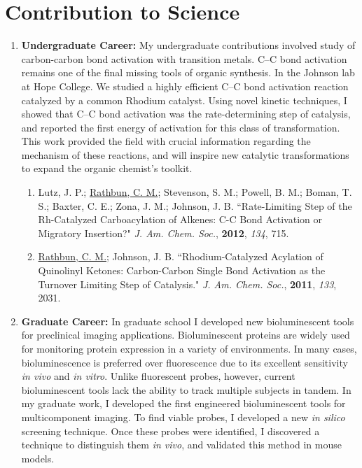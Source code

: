 \documentclass{nihbiosketch}
\begin{document}

\section{Contribution to Science}

\begin{enumerate}

\item \textbf{Undergraduate Career:} My undergraduate contributions involved study of carbon-carbon bond activation with transition metals. C--C bond activation remains one of the final missing tools of organic synthesis. In the Johnson lab at Hope College. We studied a highly efficient C--C bond activation reaction catalyzed by a common Rhodium catalyst. Using novel kinetic techniques, I showed that C--C bond activation was the rate-determining step of catalysis, and reported the first energy of activation for this class of transformation. This work provided the field with crucial information regarding the mechanism of these reactions, and will inspire new catalytic transformations to expand the organic chemist's toolkit.

\begin{enumerate}

  \item Lutz, J. P.; \underline{Rathbun, C. M.}; Stevenson, S. M.; Powell, B. M.; Boman, T. S.; Baxter, C. E.; Zona, J. M.; Johnson, J. B. ``Rate-Limiting Step of the Rh-Catalyzed Carboacylation of Alkenes: C-C Bond Activation or Migratory Insertion?" \textit{J. Am. Chem. Soc.}, \textbf{2012}, \textit{134}, 715.

  \item \underline{Rathbun, C. M.}; Johnson, J. B. ``Rhodium-Catalyzed Acylation of Quinolinyl Ketones: Carbon-Carbon Single Bond Activation as the Turnover Limiting Step of Catalysis." \textit{J. Am. Chem. Soc.}, \textbf{2011}, \textit{133}, 2031.

\end{enumerate}


\item \textbf{Graduate Career:} In graduate school I developed new bioluminescent tools for preclinical imaging applications. Bioluminescent proteins are widely used for monitoring protein expression in a variety of environments. In many cases, bioluminescence is preferred over fluorescence due to its excellent sensitivity \textit{in vivo} and \textit{in vitro}. Unlike fluorescent probes, however, current bioluminescent tools lack the ability to track multiple subjects in tandem. In my graduate work, I developed the first engineered bioluminescent tools for multicomponent imaging. To find viable probes, I developed a new \textit{in silico} screening technique. Once these probes were identified, I discovered a technique to distinguish them \textit{in vivo}, and validated this method in mouse models.


\end{enumerate}
\end{document}
